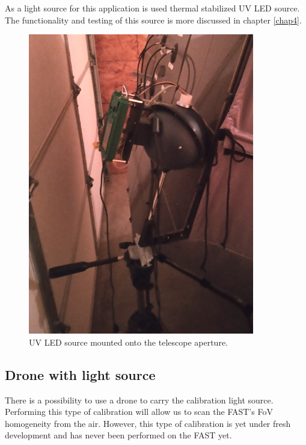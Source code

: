 \par
As a light source for this application is used thermal stabilized UV LED source. The functionality and testing of this source is more discussed in chapter \ref{chap4}.


\begin{figure}[H]
 \centering
 \includegraphics[scale=0.35, angle = 0]{./pictures/CalibMech.png}
 \caption{UV LED source mounted onto the telescope aperture.}
 \label{bottomCal}
 
\end{figure}

\subsection{Drone with light source}
There is a possibility to use a drone to carry the calibration light source. Performing this type of calibration will allow us to scan the FAST's FoV homogeneity from the air. However, this type of calibration is yet under fresh development and has never been performed on the FAST yet.


